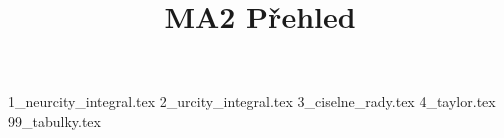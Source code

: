 \documentclass[a4paper]{article}
\begin{document}
\title{MA2 Přehled}

\maketitle
\pagebreak

{1_neurcity_integral.tex}
{2_urcity_integral.tex}
{3_ciselne_rady.tex}
{4_taylor.tex}
{99_tabulky.tex}
\end{document}
